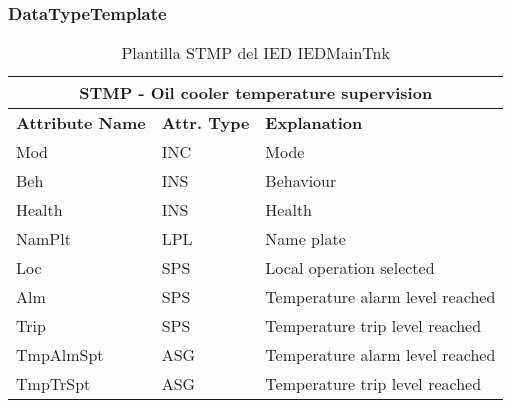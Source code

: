     \subsubsection{DataTypeTemplate}
    \begin{table}[H]
    \begin{center}
    \begin{tabular}{|l|l|p{8.5cm}|}
            \hline
            \multicolumn{3}{|c|}{\cellcolor[gray]{0.8} \textbf{ STMP}  - Oil cooler temperature supervision} \\
            \hline
            \textbf{Attribute Name} & \textbf{Attr. Type} & \textbf{Explanation} \\
            \hline 
            Mod & INC & Mode \\
            \hline
            Beh & INS & Behaviour \\
            \hline
            Health & INS & Health \\
            \hline
            NamPlt & LPL & Name plate \\
            \hline
            Loc & SPS & Local operation selected \\
            \hline
            Alm & SPS & Temperature alarm level reached \\
            \hline
            Trip & SPS & Temperature trip level reached \\
            \hline
            TmpAlmSpt & ASG & Temperature alarm level reached \\
            \hline
            TmpTrSpt & ASG & Temperature trip level reached \\
            \hline
    \end{tabular}
    \caption{Plantilla STMP del IED IEDMainTnk}
    \label{table:lnTypeSTMP6}
    \end{center}
    \end{table}
    
    
    